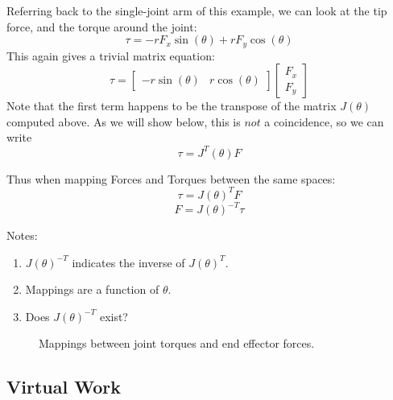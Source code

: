 \begin{ExampleCont}
Referring back to the single-joint arm of this example,
we can look at the tip force, and the torque around the joint:
\[
\tau = -r F_x\sin(\theta)+rF_y\cos(\theta)
\]
This again gives a trivial matrix equation:
\[
\tau =
\left [ \begin{array}{cc}
-r\sin(\theta) & r\cos(\theta)
\end{array} \right ]
\left [ \begin{array}{c}
F_x \\ F_y
\end{array} \right ]
\]
Note that the first term happens to be the transpose of the matrix $J(\theta)$ computed above.  As we will show below, this is $not$ a coincidence, so we can write
\[
\tau = J^T(\theta) F
\]
\end{ExampleCont}

Thus when mapping Forces and Torques between the same spaces:
\[
\tau = {J(\theta)}^T F
\]
\[
F = {J(\theta)}^{-T}\tau
\]

Notes:
\begin{enumerate}
\item  ${J(\theta)}^{-T}$ indicates the inverse of $J(\theta)^T$.
\item Mappings are a function of $\theta$.
\item Does ${J(\theta)}^{-T}$ exist?
\end{enumerate}


\begin{figure}
\centering
{}
\caption{Mappings between joint torques and end effector forces.}\label{FSpaces}
\end{figure}






\subsection{Virtual Work}

